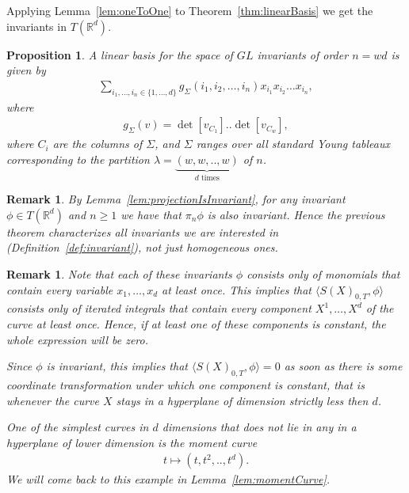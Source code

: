\documentclass{scrartcl}
\theoremstyle{plain}
\newtheorem{proposition}[theorem]{Proposition}
\newtheorem{remark}[theorem]{Remark}
\theoremstyle{definition}
\newcommand{\R}{\mathbb{R}}
\newcommand{\1}[1]{1_{\{#1\}}}
\newcommand{\ds}{d} %
\newcommand{\TS}{T(\R^\ds)} %
\begin{document}
Applying Lemma~\ref{lem:oneToOne} to Theorem~\ref{thm:linearBasis} we get the invariants in $\TS$.
\begin{proposition}
  \label{prop:glInvariants}
  A linear basis for the space of $GL$ invariants of order $n = w \ds$ is given by
  \begin{align*}
    \sum_{i_1,\dots,i_n \in \{1,\dots,d\}} g_\Sigma(i_1,i_2,\dots,i_n) x_{i_1} x_{i_2} \dots x_{i_n},
  \end{align*}
  where
  \begin{align*}
    g_\Sigma(v) = \det[ v_{C_1} ]  .. \det[ v_{C_w} ],
  \end{align*}
  where
  $C_i$ are the columns of $\Sigma$,
  and
  $\Sigma$ ranges over all standard Young tableaux corresponding to the partition $\lambda = \underbrace{(w, w, .., w)}_{d \text{ times}}$ of $n$.
\end{proposition}
\begin{remark}
  By Lemma~\ref{lem:projectionIsInvariant},
  for any invariant $\phi \in \TS$ and $n\ge 1$ we have that $\pi_n \phi$ is also invariant.
  Hence the previous theorem characterizes \emph{all} invariants we are interested in (Definition~\ref{def:invariant}),
  not just homogeneous ones.
\end{remark}

\begin{remark}
  \label{rem:hyperplane}
  Note that each of these invariants $\phi$ consists only of monomials that
  contain \emph{every} variable $x_1, \dots, x_\ds$ at least once.
  This implies that $\langle S(X)_{0,T}, \phi \rangle$
  consists only of iterated integrals that contain every component
  $X^1,\dots,X^d$ of the curve at least once.
  Hence, if at least one of these components is constant,
  the whole expression will be zero.

  Since $\phi$ is invariant, this implies that 
  $\langle S(X)_{0,T}, \phi \rangle = 0$ as soon as 
  there is some coordinate transformation under which one component is constant,
  that is whenever the curve $X$ stays in a hyperplane of dimension strictly less then $d$.

  One of the simplest curves in $\ds$ dimensions that does \emph{not} lie in any in a hyperplane of lower dimension is the \emph{moment curve}
  \begin{align*}
      t \mapsto (t,t^2,..,t^d).
  \end{align*}
  We will come back to this example in Lemma~\ref{lem:momentCurve}.

\end{remark}
\end{document}
